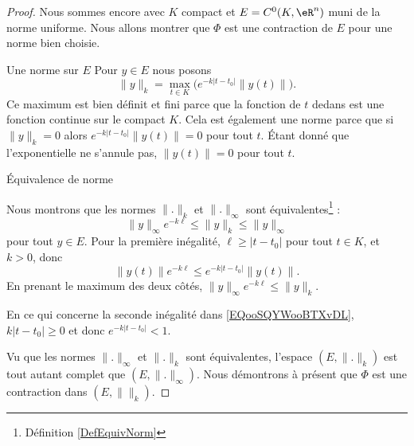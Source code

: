 \begin{proof}
    Nous sommes encore avec \( K\) compact et \( E=C^0(K,\eR^n)\) muni de la norme uniforme. Nous allons montrer que \( \Phi\) est une contraction de \( E\) pour une norme bien choisie.

    \begin{subproof}
        \item[Une norme sur \( E\)]
            Pour \( y\in E\) nous posons
            \begin{equation}
                \| y \|_k=\max_{t\in K}\big(  e^{-k| t-t_0 |}\| y(t) \| \big).
            \end{equation}
            Ce maximum est bien définit et fini parce que la fonction de \( t\) dedans est une fonction continue sur le compact \( K\). Cela est également une norme parce que si \( \| y \|_k=0\) alors \(  e^{-k| t-t_0 |}\| y(t) \|=0\) pour tout \( t\). Étant donné que l'exponentielle ne s'annule pas, \( \| y(t) \|=0\) pour tout \( t\).
        \item[Équivalence de norme]

            Nous montrons que les normes \( \| . \|_k\) et \( \| . \|_{\infty}\) sont équivalentes\footnote{Définition \ref{DefEquivNorm}} :
            \begin{equation}        \label{EQooSQYWooBTXvDL}
                \| y \|_{\infty} e^{-k\ell}\leq \| y \|_k\leq \| y \|_{\infty}
            \end{equation}
            pour tout \( y\in E\). Pour la première inégalité, \( \ell\geq | t-t_0 |\) pour tout \( t\in K\), et \( k>0\), donc
            \begin{equation}
                \| y(t) \| e^{-k\ell}\leq  e^{-k| t-t_0 |}\| y(t) \|.
            \end{equation}
            En prenant le maximum des deux côtés, \( \| y \|_{\infty} e^{-k\ell}\leq \| y \|_k\). 

            En ce qui concerne la seconde inégalité dans \eqref{EQooSQYWooBTXvDL}, \( k| t-t_0 |\geq 0\) et donc \(  e^{-k| t-t_0 |}<1\).

    \end{subproof}
    Vu que les normes \( \| . \|_{\infty}\) et \( \| . \|_k\) sont équivalentes, l'espace \( (E,\| . \|_k)\) est tout autant complet que \( (E,\| . \|_{\infty})\). Nous démontrons à présent que \( \Phi\) est une contraction dans \( (E,\|  \|_k)\). 


\end{proof}
